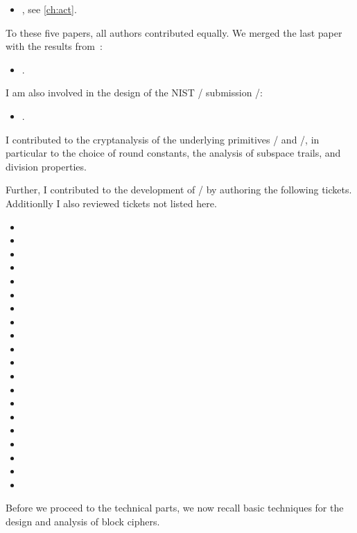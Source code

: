 \begin{itemize}
    \item[] , see \cref{ch:act}.
\end{itemize}
To these five papers, all authors contributed equally.
We merged the last paper with the results from~:
\begin{itemize}
    \item[] .
\end{itemize}
I am also involved in the design of the NIST \LWC/ submission \spook/:
\begin{itemize}
    \item[] .
\end{itemize}
I contributed to the cryptanalysis of the underlying primitives \clyde/ and \shadow/, in particular to the choice of round constants, the analysis of subspace trails, and division properties.

Further, I contributed to the development of \sage/ by authoring the following tickets.
Additionlly I also reviewed tickets not listed here.
\begin{itemize}
    \setlength\itemsep{0em}
    \item[] 
    \item[] 
    \item[] 
    \item[] 
    \item[] 
    \item[] 
    \item[] 
    \item[] 
    \item[] 
    \item[] 
    \item[] 
    \item[] 
    \item[] 
    \item[] 
    \item[] 
    \item[] 
    \item[] 
    \item[] 
    \item[] 
    \item[] 
\end{itemize}

Before we proceed to the technical parts, we now recall basic techniques for the design and analysis of block ciphers.
